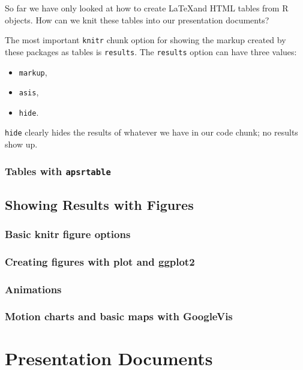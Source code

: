 \documentclass[ChapterTOCs,krantz1]{krantz}\usepackage{graphicx, color}
\begin{document}
So far we have only looked at how to create \LaTeX and HTML tables from R objects. How can we knit these tables into our presentation documents?

The most important \texttt{knitr} chunk option for showing the markup created by these packages as tables is \texttt{results}. The \texttt{results} option can have three values:

\begin{itemize}
\item
  \texttt{markup},
\item
  \texttt{asis},
\item
  \texttt{hide}.
\end{itemize}
\texttt{hide} clearly hides the results of whatever we have in our code chunk; no results show up.

\section{Tables with \texttt{apsrtable}}






\chapter{Showing Results with Figures}


\section{Basic knitr figure options}

\section{Creating figures with plot and ggplot2}

\section{Animations}

\section{Motion charts and basic maps with GoogleVis}


\part{Presentation Documents}
\end{document}
